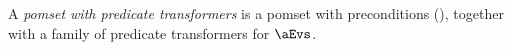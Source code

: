 \begin{definition}
  A \emph{pomset with predicate transformers} is a pomset with preconditions (),
  together with a family of predicate transformers for $\aEvs$.
\end{definition}
\begin{comment}
  Let $\PomTrans$ be the set of all pomsets with predicate transformers.
  We can covert between pomsets with preconditions and pomsets with predicate
  transformers. In one direction, $\sTHREAD{}:2^{\PomTrans}\fun2^{\PomPre}$
  drops predicate transformers, and in the other,
  $\sFORK{}:2^{\PomPre}\fun2^{\PomTrans}$ adopts the identity transformer.

  \begin{definition}
    \label{def:pomsets-group}
    \noindent
    If $\aPS \in \sTHREAD{\aPSS}$ then
    $(\exists\aPS_1\in\aPSS)$
    \begin{enumerate}[topsep=0pt]
    \item  \label{thread-E} %
      $\aEvs=\aEvs_1$,
    \item  \label{thread-lambda} %
      $\labelingAct(\aEv) = \labelingAct_1(\aEv)$,
    \item \label{thread-le} %
      if $\bEv\le_1\aEv$ then $\bEv\le\aEv$,
    \item  \label{thread-kappa}\label{T3} %
      $\labelingForm(\aEv) \rimplies \labelingForm_1(\aEv)$.
      \newcounter{pomsetXThreadCount}
      \setcounter{pomsetXThreadCount}{\value{enumi}}
    \end{enumerate}  

    \noindent
    If $\aPS \in \sFORK{\aPSS}$ then
    $(\exists\aPS_1\in\aPSS)$
    \begin{enumerate}[topsep=0pt]
    \item \label{fork-E} %
      $\aEvs=\aEvs_1$,
    \item  \label{fork-lambda} %
      $\labelingAct(\aEv) = \labelingAct_1(\aEv)$,
    \item \label{fork-le} %
      if $\bEv\le_1\aEv$ then $\bEv\le\aEv$,
      \newcounter{pomsetXForkCount}
      \setcounter{pomsetXForkCount}{\value{enumi}}
    \item  \label{fork-kappa}\label{F3}  %
      $\labelingForm(\aEv) \rimplies \labelingForm_1(\aEv)$, 
    \item  \label{fork-tau}\label{F4}  %
      $\aTr{\bEvs}{\bForm} \rimplies \bForm$.
    \end{enumerate}  
  \end{definition}


\end{comment}
